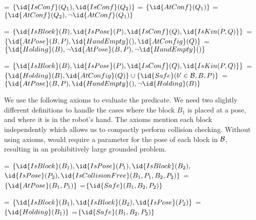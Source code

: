 \documentclass[letterpaper]{article} %
\theoremstyle{plain}\newtheorem{thm}{Theorem}
\theoremstyle{definition}\newtheorem{defn}{Definition}
\theoremstyle{plain}\newtheorem{lem}{Lemma}
\theoremstyle{plain}\newtheorem{cor}{Corollary}
\begin{document}
\begin{footnotesize}
\begin{codebox}
\zi {} = $\{\id{IsConf}(Q_1), \id{IsConf}(Q_2)\}$
\zi {} = $\{\id{AtConf}(Q_1)\}$
\zi {} = $\{\id{AtConf}(Q_2), \neg \id{AtConf}(Q_1)\}$
\end{codebox}
\begin{codebox}
\zi {} = $\{\id{IsBlock}(B), \id{IsPose}(P), \id{IsConf}(Q), \id{IsKin(P, Q)}\}$
\zi {} = $\{\id{AtPose}(B, P), \id{HandEmpty}(), \id{AtConfig}(Q)\}$
\zi {} = $\{\id{Holding}(B), \neg \id{AtPose}(B, P), \neg \id{HandEmpty}()\}$
\end{codebox}
\begin{codebox}
\zi {} = $\{\id{IsBlock}(B), \id{IsPose}(P), \id{IsConf}(Q), \id{IsKin(P, Q)}\}$
\zi {} = $\{\id{Holding}(B), \id{AtConfig}(Q)\} \cup \{\id{Safe}(b' \in {\cal B}, B, P)\}$
\zi {} = $\{\id{AtPose}(B, P), \id{HandEmpty}(), \neg \id{Holding}(B)\}$
\end{codebox}
\end{footnotesize}

We use the following axioms to evaluate the  predicate.
We need two slightly different definitions to handle the cases where the block $B_1$ is placed at a pose,
and where it is in the robot's hand.
The  axioms mention each block independently which allows us to compactly perform collision checking. 
Without using axioms,  would require a parameter for the pose of each block in ${\cal B}$, resulting in an prohibitively large grounded problem.

\begin{footnotesize}
\begin{codebox}
\zi {} = $\{\id{IsBlock}(B_1), \id{IsPose}(P_1), \id{IsBlock}(B_2),$ \Indentmore
\zi $\id{IsPose}(P_2), \id{IsCollisionFree}(B_1, P_1, B_2, P_2)\}$ \End
\zi {} = $\{\id{AtPose}(B_1, P_1)\}$
\zi {} =$\{\id{Safe}(B_1, B_2, P_2)\}$
\end{codebox}
\begin{codebox}
\zi {} = $\{\id{IsBlock}(B_1), \id{IsBlock}(B_2), \id{IsPose}(P_2)\}$ \End
\zi {} = $\{\id{Holding}(B_1)\}$
\zi {} =$\{\id{Safe}(B_1, B_2, P_2)\}$
\end{codebox}
\end{footnotesize}
\end{document}

